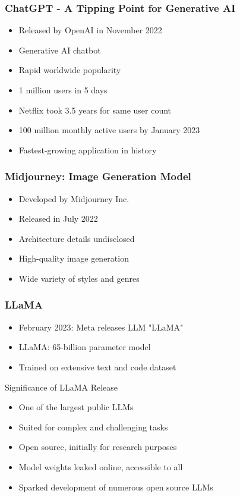 \begin{frame}[fragile]\frametitle{ChatGPT - A Tipping Point for Generative AI}
    \begin{itemize}
        \item Released by OpenAI in November 2022
        \item Generative AI chatbot
        \item Rapid worldwide popularity
        \item 1 million users in 5 days
        \item Netflix took 3.5 years for same user count
        \item 100 million monthly active users by January 2023
        \item Fastest-growing application in history
    \end{itemize}
\end{frame}

\begin{frame}[fragile]\frametitle{Midjourney: Image Generation Model}
    
    \begin{itemize}
        \item Developed by Midjourney Inc.
        \item Released in July 2022
        \item Architecture details undisclosed
        \item High-quality image generation
        \item Wide variety of styles and genres
    \end{itemize}
	
\end{frame}

\begin{frame}[fragile]\frametitle{LLaMA}

    \begin{itemize}
        \item February 2023: Meta releases LLM "LLaMA"
        \item LLaMA: 65-billion parameter model
        \item Trained on extensive text and code dataset
    \end{itemize}
	
Significance of LLaMA Release

    \begin{itemize}
        \item One of the largest public LLMs
        \item Suited for complex and challenging tasks
        \item Open source, initially for research purposes
        \item Model weights leaked online, accessible to all
        \item Sparked development of numerous open source LLMs
    \end{itemize}
\end{frame}


